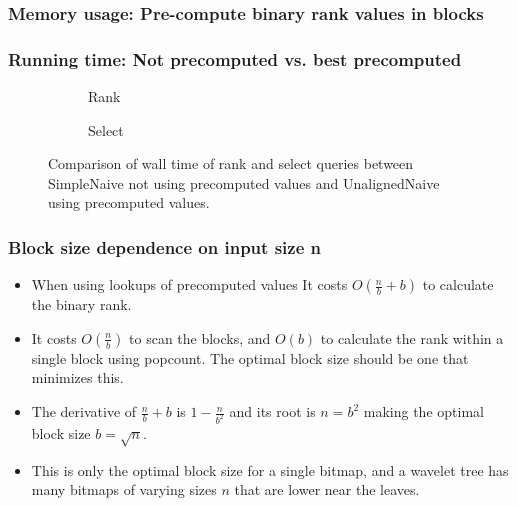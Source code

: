 \documentclass{beamer}
\begin{document}
\begin{frame}
\frametitle{Memory usage: Pre-compute binary rank values in blocks}
\begin{center}
\begin{tiny}

\end{tiny}
\end{center}
\end{frame}

\begin{frame}
\frametitle{Running time: Not precomputed vs. best precomputed}
\begin{figure}
	\begin{subfigure}{0.48\textwidth}
		\begin{tiny}
		\scalebox{.7}{}
		\end{tiny}
		\caption{Rank}
	\end{subfigure}
	\hfill
	\begin{subfigure}{0.48\textwidth}
		\begin{tiny}
		\scalebox{.7}{}
		\end{tiny}
		\caption{Select}
	\end{subfigure}
	\caption{Comparison of wall time of rank and select queries between SimpleNaive not using precomputed values and UnalignedNaive using precomputed values.}
\end{figure}
\end{frame}

\begin{frame}
\frametitle{Block size dependence on input size n}
\begin{itemize}
\item When using lookups of precomputed values
It costs $O(\frac{n}{b} + b)$ to calculate the binary rank.
\item It costs $O(\frac{n}{b})$ to scan the blocks, and $O(b)$ to calculate the rank within a single block using popcount. The optimal block size should be one that minimizes this.
\item The derivative of $\frac{n}{b}+b$ is $1-\frac{n}{b^2}$ and its root is $n = b^2$ making the optimal block size $b = \sqrt{n}$.
\item This is only the optimal block size for a single bitmap, and a wavelet tree has many bitmaps of varying sizes $n$ that are lower near the leaves.
\end{itemize}
\end{frame}
\end{document}
